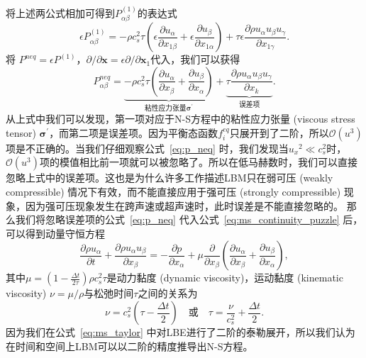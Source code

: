 将上述两公式相加可得到$P_{\alpha \beta}^{(1)}$的表达式
\begin{equation}
\epsilon P_{\alpha \beta}^{(1)}=-\rho c_{s}^{2} \tau\left(\epsilon \frac{\partial u_{\alpha}}{\partial x_{1 \beta}}+\epsilon \frac{\partial u_{\beta}}{\partial x_{1 \alpha}}\right)+\tau \epsilon \frac{\partial \rho u_{\alpha} u_{\beta} u_{\gamma}}{\partial x_{1 \gamma}}.
\end{equation}
将 $P^{n e q}=\epsilon P^{(1)}$，$\partial / \partial \boldsymbol{x}=\epsilon \partial / \partial \boldsymbol{x}_{1}$代入，我们可以获得
\begin{equation}
P_{\alpha \beta}^{n e q}=\underbrace{-\rho c_{s}^{2} \tau\left(\frac{\partial u_{\alpha}}{\partial x_{\beta}}+\frac{\partial u_{\beta}}{\partial x_{\alpha}}\right)}_{\text{粘性应力张量}\boldsymbol{\sigma}^{\prime}}+\underbrace{\tau \frac{\partial \rho u_{\alpha} u_{\beta} u_{\gamma}}{\partial x_{k}}}_{\text {误差项}} .
\label{eq:p_neq}
\end{equation}
从上式中我们可以发现，第一项对应于N-S方程中的粘性应力张量 (viscous stress tensor) $\boldsymbol{\sigma}^{\prime}$，而第二项是误差项。因为平衡态函数$f_i^{eq}$只展开到了二阶，所以$\mathcal{O}\left(u^{3}\right)$项是不正确的。当我们仔细观察公式~\ref{eq:p_neq} 时，我们发现当${u_x}^{2} \ll c_{s}^{2}$时，$\mathcal{O}\left(u^{3}\right)$项的模值相比前一项就可以被忽略了。所以在低马赫数时，我们可以直接忽略上式中的误差项。这也是为什么许多工作描述LBM只在弱可压 (weakly compressible) 情况下有效，而不能直接应用于强可压 (strongly compressible) 现象，因为强可压现象发生在跨声速或超声速时，此时误差是不能直接忽略的。
那么我们将忽略误差项的公式~\ref{eq:p_neq} 代入公式~\ref{eq:ms_continuity_puzzle} 后，可以得到动量守恒方程
\begin{equation}
    \frac{\partial \rho u_{\alpha}}{\partial t}+\frac{\partial \rho u_{\alpha} u_{\beta}}{\partial x_{\beta}}=-\frac{\partial p}{\partial x_{\alpha}}+\mu \frac{\partial}{\partial x_{\beta}}\left(\frac{\partial u_{\alpha}}{\partial x_{\beta}}+\frac{\partial u_{\beta}}{\partial x_{\alpha}}\right),
\end{equation}
其中$\mu=\left(1-\frac{\Delta t}{2 \tau}\right) \rho c_{s}^{2} \tau$是动力黏度 (dynamic viscosity)，运动黏度 (kinematic viscosity) $\nu=\mu / \rho$与松弛时间$\tau$之间的关系为
\begin{equation}
    \nu=c_{s}^{2}\left(\tau-\frac{\Delta t}{2}\right) \quad \text {或} \quad \tau=\frac{\nu}{c_{s}^{2}}+\frac{\Delta t}{2} .
\end{equation}
因为我们在公式~\ref{eq:ms_taylor} 中对LBE进行了二阶的泰勒展开，所以我们认为在时间和空间上LBM可以以二阶的精度推导出N-S方程。


